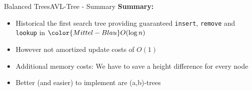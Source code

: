 \begin{frame}{Balanced Trees}{AVL-Tree - Summary}
  \textbf{Summary:}
  \begin{itemize}
    \item<2->
      Historical the first search tree providing guaranteed
      \texttt{\color{Mittel-Blau}insert}, \texttt{\color{Mittel-Blau}remove}
      and \texttt{\color{Mittel-Blau}lookup} in
      ${\color{Mittel-Blau}O(\log n)}$
    \item<3->
      However not amortized update costs of {\color{Mittel-Blau}$O(1)$}
    \item<4->
      Additional memory costs:
      We have to save a height difference for every node
    \item<5->
      Better (and easier) to implement are {\color{Mittel-Blau}(a,b)}-trees
  \end{itemize}
\end{frame}
